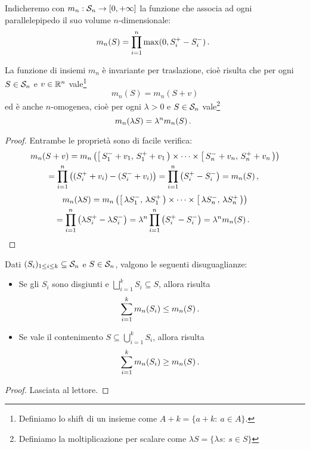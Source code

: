 \begin{definition}\label{def:LebesgueElementare}
	Indicheremo con $m_n:\S_n\to\Rpiu$ la funzione che associa ad ogni parallelepipedo il suo volume $n$-dimensionale:
	\begin{equation*}
		m_n(S)=\prod_{i=1}^n\max(0,S^+_i-S^-_i) \punto
	\end{equation*}
\end{definition}
\begin{remark}\label{nota:LebesgueElementareProprieta}
	La funzione di insiemi $m_n$ è invariante per traslazione, cioè risulta che per ogni $S\in\S_n$ e $v\in\R^n$ vale\footnote{Definiamo lo shift di un insieme come $A+k=\{a+k:\ a\in A\}$.}
	\begin{equation*}
		m_n(S)=m_n(S+v)
	\end{equation*}
	ed è anche $n$-omogenea, cioè per ogni $\lambda>0$ e $S\in\S_n$ vale\footnote{Definiamo la moltiplicazione per scalare come $\lambda S=\{\lambda s:\ s\in S\}$}
	\begin{equation*}
		m_n(\lambda S)=\lambda^n m_n(S)\punto
	\end{equation*}
\end{remark}
\begin{proof}
	Entrambe le proprietà sono di facile verifica:
	\begin{multline*}
		m_n(S+v)=m_n\left(\co{S^-_1+v_1}{S^+_1+v_1}\times\cdots\times\co{S^-_n+v_n}{S^+_n+v_n}\right)\\
		=\prod_{i=1}^n\left((S^+_i+v_i)-(S^-_i+v_i)\right)=\prod_{i=1}^n\left(S^+_i-S^-_i\right)=m_n(S)\virgola
	\end{multline*}
	\begin{multline*}
		m_n(\lambda S)=m_n\left(\co{\lambda S^-_1}{\lambda S^+_1}\times\cdots\times\co{\lambda S^-_n}{\lambda S^+_n}\right)\\
		=\prod_{i=1}^n\left(\lambda S^+_i-\lambda S^-_i\right)=\lambda^n\prod_{i=1}^n\left(S^+_i-S^-_i\right)=\lambda^n m_n(S)\punto
	\end{multline*}
\end{proof}


\begin{lemma}\label{lemma:LebesgueElementareFinita}
	Dati $(S_i)_{1\le i\le k}\subseteq \S_n$ e $S\in\S_n$, valgono le seguenti disuguaglianze:
	\begin{itemize}
		\item Se gli $S_i$ sono disgiunti e $\bigsqcup_{i=1}^k S_i\subseteq S$, allora risulta
		\begin{equation*}
			\sum_{i=1}^k m_n(S_i)\le m_n(S)\punto
		\end{equation*}
		\item Se vale il contenimento $S\subseteq\bigcup_{i=1}^k S_i$, allora risulta
		\begin{equation*}
			\sum_{i=1}^k m_n(S_i)\ge m_n(S)\punto
		\end{equation*}
	\end{itemize}
\end{lemma}
\begin{proof}
	Lasciata al lettore.
\end{proof}

